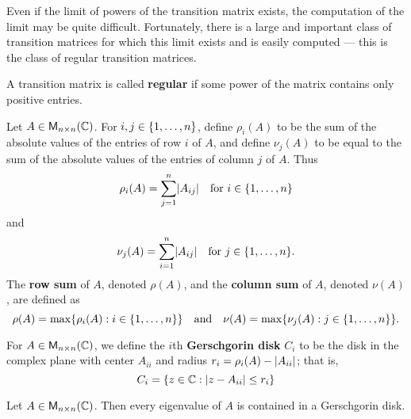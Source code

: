 \begin{note}
	Even if the limit of powers of the transition matrix exists, the computation of the limit may be quite difficult.
	Fortunately, there is a large and important class of transition matrices for which this limit exists and is easily computed
	--- this is the class of regular transition matrices.
\end{note}

\begin{defn}\label{5.3.7}
	A transition matrix is called \textbf{regular} if some power of the matrix contains only positive entries.
\end{defn}

\begin{defn}\label{5.3.8}
	Let \(A \in \mathsf{M}_{{n} \times n}({\mathbb{C}})\).
	For \(i, j \in \left\lbrace1, \dots, n\right\rbrace\), define \(\rho_i(A)\) to be the sum of the absolute values of the entries of row \(i\) of \(A\), and define \(\nu_j(A)\) to be equal to the sum of the absolute values of the entries of column \(j\) of \(A\).
	Thus
	\[
		\rho_i(A) = \sum_{j = 1}^n \abs{A_{i j}} \quad \text{for } i \in \set{1, \dots, n}
	\]
	and
	\[
		\nu_j(A) = \sum_{i = 1}^n \abs{A_{i j}} \quad \text{for } j \in \set{1, \dots, n}.
	\]
	The \textbf{row sum} of \(A\), denoted \(\rho(A)\), and the \textbf{column sum} of \(A\), denoted \(\nu(A)\), are defined as
	\[
		\rho(A) = \max\set{\rho_i(A) : i \in \set{1, \dots, n}} \quad \text{and} \quad \nu(A) = \max\set{\nu_j(A) : j \in \set{1, \dots, n}}.
	\]
\end{defn}

\begin{defn}\label{5.3.9}
	For \(A \in \mathsf{M}_{{n} \times n}({\mathbb{C}})\), we define the \(i\)th \textbf{Gerschgorin disk} \(C_i\) to be the disk in the complex plane with center \(A_{i i}\) and radius \(r_i = \rho_i(A) - \left\lvert A_{i i}\right\rvert\);
	that is,
	\[
		C_i = \left\lbrace z \in \mathbb{C} : \left\lvert z - A_{i i}\right\rvert \leq r_i\right\rbrace
	\]
\end{defn}

\begin{thm}\label{5.16}
	Let \(A \in \mathsf{M}_{{n} \times n}({\mathbb{C}})\).
	Then every eigenvalue of \(A\) is contained in a Gerschgorin disk.
\end{thm}


